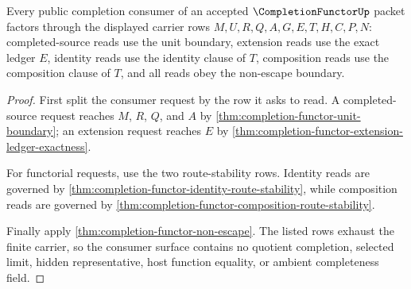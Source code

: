 \begin{theorem}
\label{thm:completion-functor-completion-consumer-surface}
Every public completion consumer of an accepted $\CompletionFunctorUp$ packet factors through the displayed carrier rows $M,U,R,Q,A,G,E,T,H,C,P,N$: completed-source reads use the unit boundary, extension reads use the exact ledger $E$, identity reads use the identity clause of $T$, composition reads use the composition clause of $T$, and all reads obey the non-escape boundary.
\end{theorem}
\begin{proof}
First split the consumer request by the row it asks to read. A completed-source request reaches $M$, $R$, $Q$, and $A$ by \autoref{thm:completion-functor-unit-boundary}; an extension request reaches $E$ by \autoref{thm:completion-functor-extension-ledger-exactness}.

For functorial requests, use the two route-stability rows. Identity reads are governed by \autoref{thm:completion-functor-identity-route-stability}, while composition reads are governed by \autoref{thm:completion-functor-composition-route-stability}.

Finally apply \autoref{thm:completion-functor-non-escape}. The listed rows exhaust the finite carrier, so the consumer surface contains no quotient completion, selected limit, hidden representative, host function equality, or ambient completeness field.
\end{proof}

